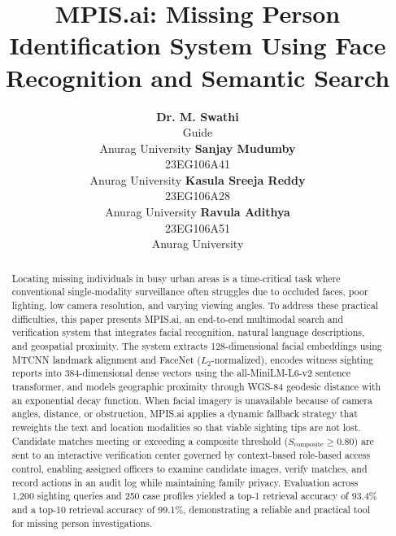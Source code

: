 \documentclass[conference]{IEEEtran}
\begin{document}
\title{MPIS.ai: Missing Person Identification System Using Face Recognition and Semantic Search}

\author{
\begin{tabular}{cccc}
\parbox{0.23\textwidth}{\centering
    \textbf{Dr. M. Swathi}\\[2pt]
    Guide\\
    Anurag University
}
&
\parbox{0.23\textwidth}{\centering
    \textbf{Sanjay Mudumby}\\[2pt]
    23EG106A41\\
    Anurag University
}
&
\parbox{0.23\textwidth}{\centering
    \textbf{Kasula Sreeja Reddy}\\[2pt]
    23EG106A28\\
    Anurag University
}
&
\parbox{0.23\textwidth}{\centering
    \textbf{Ravula Adithya}\\[2pt]
    23EG106A51\\
    Anurag University
}
\end{tabular}
}

\maketitle

\begin{abstract}
Locating missing individuals in busy urban areas is a time-critical task where conventional single-modality surveillance often struggles due to occluded faces, poor lighting, low camera resolution, and varying viewing angles. To address these practical difficulties, this paper presents MPIS.ai, an end-to-end multimodal search and verification system that integrates facial recognition, natural language descriptions, and geospatial proximity. The system extracts 128-dimensional facial embeddings using MTCNN landmark alignment and FaceNet ($L_2$-normalized), encodes witness sighting reports into 384-dimensional dense vectors using the all-MiniLM-L6-v2 sentence transformer, and models geographic proximity through WGS-84 geodesic distance with an exponential decay function. When facial imagery is unavailable because of camera angles, distance, or obstruction, MPIS.ai applies a dynamic fallback strategy that reweights the text and location modalities so that viable sighting tips are not lost. Candidate matches meeting or exceeding a composite threshold ($S_{\text{composite}} \ge 0.80$) are sent to an interactive verification center governed by context-based role-based access control, enabling assigned officers to examine candidate images, verify matches, and record actions in an audit log while maintaining family privacy. Evaluation across 1,200 sighting queries and 250 case profiles yielded a top-1 retrieval accuracy of 93.4\% and a top-10 retrieval accuracy of 99.1\%, demonstrating a reliable and practical tool for missing person investigations.
\end{abstract}
\end{document}
